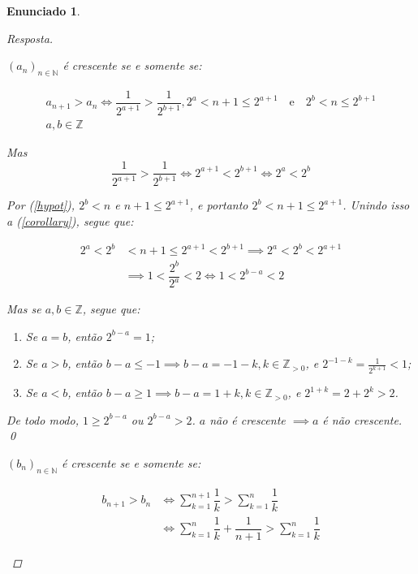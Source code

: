 \documentclass[a4paper,twoside,11pt]{article}
\newtheorem*{enunciado}{Enunciado}
\begin{document}
\begin{enunciado}
\begin{proof}[Resposta]
\begin{enumerate}[label=\alph*)]
            $(a_n)_{n \in \mathbb{N}}$ é crescente se e somente se:

            \begin{equation} \tag{1} \label{hypot}
                \begin{split}
                a_{n+1} > a_n \iff \dfrac{1}{2^{a+1}} > \dfrac{1}{2^{b+1}},2^a < n + 1 \leq 2^{a + 1}\quad\text{e}\quad2^b < n \leq 2^{b + 1}\\
                a, b \in \mathbb{Z}
                \end{split}
            \end{equation}

            Mas \begin{equation} \tag{2} \label{corollary}
                \dfrac{1}{2^{a+1}} > \dfrac{1}{2^{b+1}} \iff 2^{a+1} < 2^{b+1} \iff 2^a < 2^b
            \end{equation}
            
            Por (\ref{hypot}), $2^b < n$ e $n + 1 \leq 2^{a + 1}$, e portanto $2^b < n + 1 \leq 2^{a+1}$.
            Unindo isso a (\ref{corollary}), segue que:

            \begin{align*}
                2^a < 2^b &< n + 1 \leq 2^{a + 1} < 2^{b+1} \implies 2^a < 2^b < 2^{a + 1}\\
                &\implies 1 < \dfrac{2^b}{2^a} < 2 \iff 1 < 2^{b-a} < 2
            \end{align*}

            Mas se $a, b \in \mathbb{Z}$, segue que:
            \begin{enumerate}
                \item Se $a = b$, então $2^{b-a} = 1$;
                \item Se $a > b$, então $b - a \leq -1 \implies b - a = -1 - k, k \in \mathbb{Z}_{>0}$, e $2^{-1-k} = \frac{1}{2^{k+1}} < 1$;
                \item Se $a < b$, então $b - a \geq 1 \implies b - a = 1 + k, k \in \mathbb{Z}_{>0}$, e $2^{1+k} = 2 + 2^k > 2$.
            \end{enumerate}
            
            De todo modo, $1 \geq 2^{b-a}$ ou $2^{b-a} > 2$. \Lightning $a$ não é crescente $\implies a$ é não crescente. \qed

            $(b_n)_{n \in \mathbb{N}}$ é crescente se e somente se:
            
            \begin{align*}
                b_{n+1} > b_n &\iff \sum_{k=1}^{n+1} \dfrac{1}{k} > \sum_{k=1}^n \dfrac{1}{k}\\
                &\iff \sum_{k=1}^n \dfrac{1}{k} + \dfrac{1}{n+1} > \sum_{k=1}^n \dfrac{1}{k}
            \end{align*}


\end{enumerate}
\end{proof}
\end{enunciado}
\end{document}
